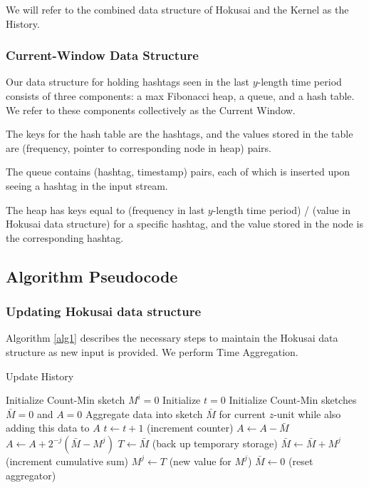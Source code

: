 \documentclass[twoside]{article}
\begin{document}
We will refer to the combined data structure of Hokusai and the Kernel as the History.

\subsubsection{Current-Window Data Structure}

Our data structure for holding hashtags seen in the last $y$-length time period consists of three components: a max Fibonacci heap, a queue, and a hash table.  We refer to these components collectively as the Current Window.

The keys for the hash table are the hashtags, and the values stored in the table are (frequency, pointer to corresponding node in heap) pairs.

The queue contains (hashtag, timestamp) pairs, each of which is inserted upon seeing a hashtag in the input stream.

The heap has keys equal to (frequency in last $y$-length time period) / (value in Hokusai data structure) for a specific hashtag, and the value stored in the node is the corresponding hashtag.


\subsection{Algorithm Pseudocode} 

\subsubsection{Updating Hokusai data structure}

Algorithm \ref{alg1} describes the necessary steps to maintain the Hokusai data structure as new input is provided. We perform Time Aggregation. 

\begin{algorithm}
\caption{Update History} \label{alg1}
\begin{algorithmic}[1]
	\State Initialize Count-Min sketch $M^i = 0$
\EndFor
\State Initialize $t = 0$
\State Initialize Count-Min sketches $\bar{M} = 0$ and $A = 0$
	\State Aggregate data into sketch $\bar{M}$ for current $z$-unit while also adding this data to $A$
	\State $t \leftarrow t + 1$ (increment counter)
	\State $A \leftarrow A - \bar{M}$
		\State $A \leftarrow A + 2^{-j}(\bar{M} - M^j)$
		\State $T \leftarrow \bar{M}$ (back up temporary storage)
		\State $\bar{M} \leftarrow \bar{M} + M^j$ (increment cumulative sum)
		\State $M^j \leftarrow T$ (new value for $M^j$)
	\EndFor
	\State $\bar{M} \leftarrow 0$ (reset aggregator)
\EndWhile
\end{algorithmic}
\end{algorithm}
 
\end{document}
